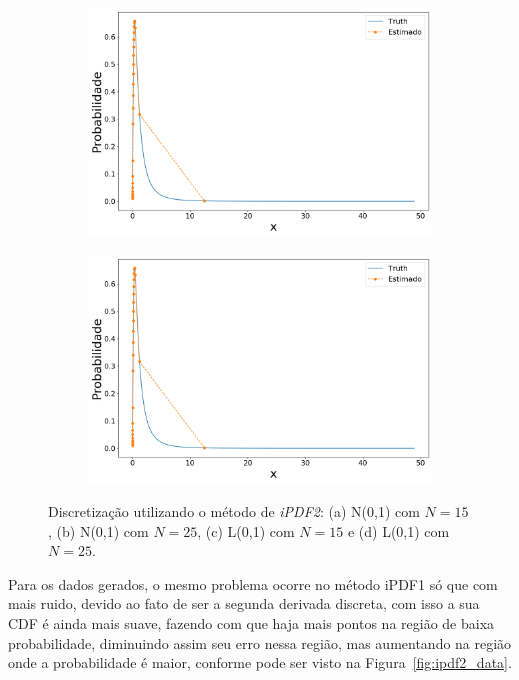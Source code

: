\begin{figure}[H]
	\begin{subfigure}[b]{0.45\textwidth}
		\centering 
		\includegraphics[width=\linewidth]{./figuras/iPDF2_lognormal_25_1_0_0}
		\caption{}
		\label{fig:ipdf2lognorm15}
	\end{subfigure}
	\hfill
	\begin{subfigure}[b]{0.45\textwidth}
		\centering 
		\includegraphics[width=\linewidth]{./figuras/iPDF2_lognormal_25_1_0_0}
		\caption{}
		\label{fig:ipdf2lognorm25}
	\end{subfigure}
	
	\caption{Discretização utilizando o método de \textit{iPDF2}: (a) N(0,1) com $N = 15$, (b) N(0,1) com $N = 25$, (c) L(0,1) com $N = 15$ e (d) L(0,1) com $N = 25$.}
	\label{fig:ipdf2norm}
\end{figure}

Para os dados gerados, o mesmo problema ocorre no método \ac{iPDF1} só que com mais ruido, devido ao fato de ser a segunda derivada discreta, com isso a sua CDF é ainda mais suave, fazendo com que haja mais pontos na região de baixa probabilidade, diminuindo assim seu erro nessa região, mas aumentando na região onde a probabilidade é maior, conforme pode ser visto na Figura~\ref{fig:ipdf2_data}.

